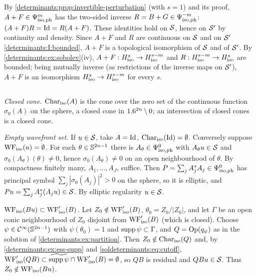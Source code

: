 \subsection*{}
By \cref{determinants:prop:invertible-perturbation} (with $s=1$) and its proof, $A+F\in\Psi^{m}_{\mathrm{iso,ph}}$ has the
two-sided inverse $R=B+G\in\Psi^{-m}_{\mathrm{iso,ph}}$: $(A+F)R=\operatorname{Id}=R(A+F)$. These identities hold on $\mathcal{S}$, hence
on $\mathcal{S}'$ by continuity and density. Since $A+F$ and $R$ are continuous on $\mathcal{S}$ and on $\mathcal{S}'$
\ref{determinants:I:bounded}, $A+F$ is a topological isomorphism of $\mathcal{S}$ and of $\mathcal{S}'$. By
\cref{determinants:ex:sobolev}(iv), $A+F:H^{s}_{\mathrm{iso}}\to H^{s-m}_{\mathrm{iso}}$ and $R:H^{s-m}_{\mathrm{iso}}\to H^{s}_{\mathrm{iso}}$ are bounded;
being mutually inverse (as restrictions of the inverse maps on $\mathcal{S}'$), $A+F$ is an isomorphism
$H^{s}_{\mathrm{iso}}\to H^{s-m}_{\mathrm{iso}}$ for every $s$.

\subsection*{}
\emph{Closed cone.} $\operatorname{Char}_{\mathrm{iso}}(A)$ is the cone over the zero set of the continuous function
$\sigma_0(A)$ on the sphere, a closed cone in $1.6^{2n}\setminus0$; an intersection of closed cones is a
closed cone.

\emph{Empty wavefront set.} If $u\in\mathcal{S}$, take $A=\operatorname{Id}$, $\operatorname{Char}_{\mathrm{iso}}(\operatorname{Id})=\emptyset$. Conversely
suppose $\operatorname{WF}_{\mathrm{iso}}(u)=\emptyset$. For each $\theta\in\mathbb{S}^{2n-1}$ there is $A_\theta\in\Psi^{0}_{\mathrm{iso,ph}}$ with
$A_\theta u\in\mathcal{S}$ and $\sigma_0(A_\theta)(\theta)\ne0$, hence $\sigma_0(A_\theta)\neq0$ on an open neighbourhood
of $\theta$. By compactness finitely many, $A_1,\dots,A_J$, suffice. Then
$P=\sum_jA_j^*A_j\in\Psi^{0}_{\mathrm{iso,ph}}$ has principal symbol $\sum_j|\sigma_0(A_j)|^2>0$ on the sphere, so it is
elliptic, and $Pu=\sum_jA_j^*(A_ju)\in\mathcal{S}$. By elliptic regularity $u\in\mathcal{S}$.

\emph{$\operatorname{WF}_{\mathrm{iso}}(Bu)\subset\operatorname{WF}_{\mathrm{iso}}'(B)$.} Let $Z_0\notin\operatorname{WF}_{\mathrm{iso}}'(B)$, $\theta_0=Z_0/|Z_0|$, and let $\Gamma$ be an
open conic neighbourhood of $Z_0$ disjoint from $\operatorname{WF}_{\mathrm{iso}}'(B)$ (which is closed). Choose
$\psi\in\mathcal{C}^\infty(\mathbb{S}^{2n-1})$ with $\psi(\theta_0)=1$ and $\operatorname{supp}\psi\subset\Gamma$, and $Q=\operatorname{Op}(q_\psi)$ as in
the solution of \cref{determinants:ex:partition}. Then $Z_0\notin\operatorname{Char}_{\mathrm{iso}}(Q)$ and, by
\cref{determinants:ex:ess-supp} and \eqref{soldeterminants:eq:cutoff},
$\operatorname{WF}_{\mathrm{iso}}'(QB)\subset\widetilde{\operatorname{supp}\psi}\cap\operatorname{WF}_{\mathrm{iso}}'(B)=\emptyset$, so $QB$ is residual and $QBu\in\mathcal{S}$.
Thus $Z_0\notin\operatorname{WF}_{\mathrm{iso}}(Bu)$.

